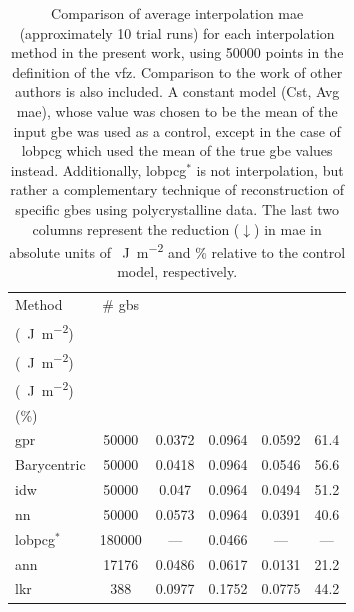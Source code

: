 \documentclass[final,twocolumn,12pt]{elsarticle}
\newcommand{\NA}{---} %
\newcommand{\inpt}{input}
\begin{document}
\begin{table}
\caption{Comparison of average interpolation \gls{mae} (approximately 10 trial runs) for each interpolation method in the present work, using \num{50000} points in the definition of the \gls{vfz}. Comparison to the work of other authors is also included. A constant model (Cst, Avg \gls{mae}), whose value was chosen to be the mean of the \inpt{} \gls{gbe} was used as a control, except in the case of \gls{lobpcg} which used the mean of the true \gls{gbe} values instead. Additionally, \gls{lobpcg}$^*$ is not interpolation, but rather a complementary technique of reconstruction of specific \glspl{gbe} using polycrystalline data. The last two columns represent the reduction ($\downarrow$) in \gls{mae} in absolute units of \SI{}{\J\per\square\meter} and \% relative to the control model, respectively.}
\centering
\begin{tabular}{lccccc}
\toprule
Method &
  \# \glspl{gb} &
  \thead{\gls{mae} \\   (\SI{}{\J\per\square\meter})} &
  \thead{Cst, Avg \gls{mae} \\   (\SI{}{\J\per\square\meter})} &
  \thead{\gls{mae} $\downarrow$ \\   (\SI{}{\J\per\square\meter})} &
  \thead{\gls{mae}   $\downarrow$ \\ (\%)} \\ \midrule
\Gls{gpr}                                                     & \num{50000}  & \num{0.0372} & \num{0.0964} & \num{0.0592} & \num{61.4} \\
Barycentric                                                   & \num{50000}  & \num{0.0418} & \num{0.0964} & \num{0.0546} & \num{56.6} \\
\gls{idw}                                                     & \num{50000}  & \num{0.047}  & \num{0.0964} & \num{0.0494} & \num{51.2} \\
\gls{nn}                                                      & \num{50000}  & \num{0.0573} & \num{0.0964} & \num{0.0391} & \num{40.6} \\
\gls{lobpcg}$^*$   \cite{shenDeterminingGrainBoundary2019}        & \num{180000} & \NA          & \num{0.0466} & \NA          & \NA        \\
\gls{ann}   \cite{restrepoUsingArtificialNeural2014} & \num{17176}  & \num{0.0486} & \num{0.0617} & \num{0.0131} & \num{21.2} \\
\gls{lkr}   \cite{chesserLearningGrainBoundary2020}           & \num{388}    & \num{0.0977} & \num{0.1752} & \num{0.0775} & \num{44.2} \\ \bottomrule
\end{tabular}
\label{tab:mae-error-comparison}
\end{table}
\end{document}
